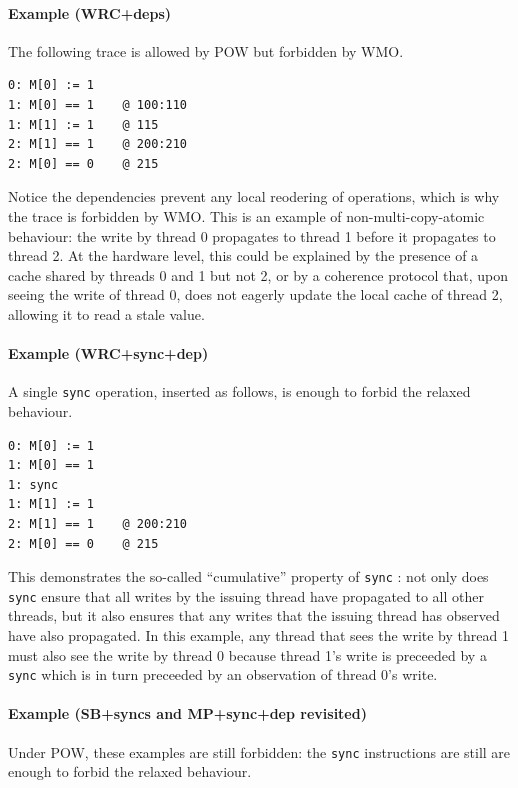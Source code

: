 \documentclass[11pt]{article}
\begin{document}
\paragraph{Example (WRC+deps)}  The following trace is allowed by POW
but forbidden by WMO.

\begin{verbatim}
0: M[0] := 1
1: M[0] == 1    @ 100:110
1: M[1] := 1    @ 115
2: M[1] == 1    @ 200:210
2: M[0] == 0    @ 215
\end{verbatim}

\noindent Notice the dependencies prevent any local reodering of
operations, which is why the trace is forbidden by WMO.  This is an
example of non-multi-copy-atomic behaviour: the write by thread 0
propagates to thread 1 before it propagates to thread 2.  At the
hardware level, this could be explained by the presence of a cache
shared by threads 0 and 1 but not 2, or by a coherence protocol that,
upon seeing the write of thread 0, does not eagerly update the local
cache of thread 2, allowing it to read a stale value.


\paragraph{Example (WRC+sync+dep)} A single \verb'sync' operation,
inserted as follows, is enough to forbid the relaxed behaviour.

\begin{verbatim}
0: M[0] := 1
1: M[0] == 1
1: sync
1: M[1] := 1
2: M[1] == 1    @ 200:210
2: M[0] == 0    @ 215
\end{verbatim}

\noindent This demonstrates the so-called ``cumulative'' property of
\verb!sync! \cite{POWER}: not only does \verb!sync! ensure that all
writes by the issuing thread have propagated to all other threads, but
it also ensures that any writes that the issuing thread has observed
have also propagated.  In this example, any thread that sees the write
by thread 1 must also see the write by thread 0 because thread 1's
write is preceeded by a \verb'sync' which is in turn preceeded by an
observation of thread 0's write.

\paragraph{Example (SB+syncs and MP+sync+dep revisited)} Under POW,
these examples are still forbidden: the \verb!sync! instructions are
still are enough to forbid the relaxed behaviour.
\end{document}
